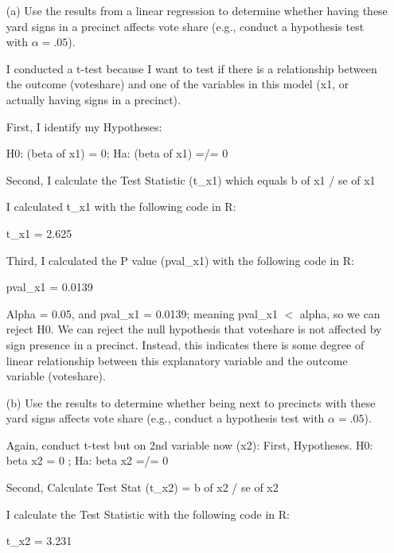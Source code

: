 \documentclass[12pt,letterpaper]{article}
\begin{document}
\vspace{10cm}
\begin{enumerate}
	\item [(a)] Use the results from a linear regression to determine whether having these yard signs in a precinct affects vote share (e.g., conduct a hypothesis test with $\alpha = .05$).
	
	I conducted a t-test because I want to test if there is a relationship between the outcome (voteshare) and one of the variables in this model (x1, or actually having signs in a precinct). 
	
	First, I identify my Hypotheses:

	H0: (beta of x1) = 0;
	Ha: (beta of x1) =/= 0
	
	Second, I calculate the Test Statistic (t\_x1) which equals b of x1 / se of x1
	
	I calculated t\_x1 with the following code in R:
	
	
	
	t\_x1 = 2.625
	
	Third, I calculated the P value (pval\_x1) with the following code in R:
	
	
	
	pval\_x1 = 0.0139
	
	 Alpha = 0.05, and pval\_x1 = 0.0139; meaning pval\_x1 $<$ alpha, so we can reject H0. We can reject the null hypothesis that voteshare is not affected by sign presence in a precinct. Instead, this indicates there is some degree of linear relationship between this explanatory variable and the outcome variable (voteshare).
	
	\newpage		
	\item [(b)]  Use the results to determine whether being
	next to precincts with these yard signs affects vote
	share (e.g., conduct a hypothesis test with $\alpha = .05$).
	
	Again, conduct t-test but on 2nd variable now (x2):
	First, Hypotheses. H0: beta x2 = 0 ; Ha: beta x2 =/= 0
	
	Second, Calculate Test Stat (t\_x2) = b of x2 / se of x2 
	
	I calculate the Test Statistic with the following code in R:
	
	
	
	t\_x2 = 3.231
	

\end{enumerate}
\end{document}
